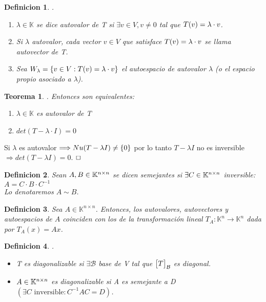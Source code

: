 \documentclass[]{article}
\newtheorem{theorem}{Teorema}
\newtheorem{definition}{Definicion}
\newenvironment{proof}{\noindent{\bf Prueba:}}{$\hfill \Box$ \vspace{10pt}}
\newcommand{\K}{
    \mathbb{K}
}
\newcommand{\ida}{\Longrightarrow}
\newcommand{\base}{\text{$\mathcal{B}$}}
\begin{document}
\newpage

\begin{definition}
    .
    \begin{enumerate}
        \item $\lambda \in \K$ se dice autovalor de T si $\exists v \in V , v\neq0$ tal que $\text{$T({v})$}=\lambda\cdot v$.
        \item Si $\lambda$ autovalor, cada vector $v\in V$ que satisface $\text{$T({v})$}=\lambda\cdot v$ se llama
        autovector de T.
        \item Sea $W_\lambda = \text{$\{ {v\in V : \text{$T({v})$}=\lambda\cdot v} \}$}$ el autoespacio de autovalor $\lambda$
        (o el espacio propio asociado a $\lambda$). 
    \end{enumerate}
\end{definition}
\begin{theorem}
    . Entonces son equivalentes:
    \begin{enumerate}
        \item $\lambda \in \K$ es autovalor de T
        \item $det(T-\lambda\cdot I)=0$
    \end{enumerate}
\end{theorem}
\begin{proof}
    Si $\lambda$ es autovalor $\ida Nu(T-\lambda I)\neq \conjunto{0}$ por lo tanto $T-\lambda I$ no es inversible
    $\ida det(T-\lambda I)=0$.
\end{proof}

\begin{definition}
    Sean $A,B \in \text{$\mathbb{K}^{n \times n}$}$ se dicen semejantes si $\exists C \in \text{$\mathbb{K}^{n \times n}$}$ inversible:  $A=C \cdot B \cdot C^{-1}$\\
    Lo denotaremos $A \sim B$.
\end{definition}

\begin{definition}
Sea \( A \in \mathbb{K}^{n \times n} \). Entonces, los autovalores, autovectores y autoespacios de $A$
coinciden con los de la transformación lineal $T_A : \K^n \to \K^n$  dada por $T_A(x) = Ax$.
\end{definition}

\begin{definition}
    .
    \begin{itemize}
        \item T es diagonalizable si $\exists \base$ base de V tal que $\cbs{T}{\base}{}$ es diagonal.
        \item $A \in \text{$\mathbb{K}^{n \times n}$}$ es diagonalizable si A es semejante a D $(\exists C \text{ inversible}: C^{-1}AC=D)$.
    \end{itemize}
\end{definition}
\end{document}
